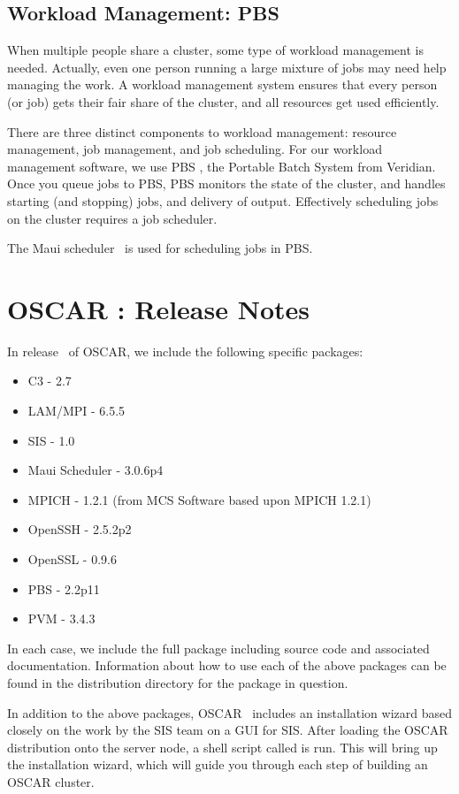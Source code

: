 \documentclass[letterpaper,11pt]{article}
\begin{document}
\subsection{Workload Management: PBS}
When multiple people share a cluster, some type of workload management
is needed.  Actually, even one person running a large mixture of jobs
may need help managing the work.  A workload management system ensures
that every person (or job) gets their fair share of the cluster, and
all resources get used efficiently.

There are three distinct components to workload management: resource
management, job management, and job scheduling.  For our workload
management software, we use PBS \cite{OpenPBS}, the Portable Batch System
from Veridian.  Once you queue jobs to PBS, PBS monitors the state of
the cluster, and handles starting (and stopping) jobs, and delivery of
output.  Effectively scheduling jobs on the cluster requires a job
scheduler.

The Maui scheduler~\cite{MAUI} is used for scheduling jobs in PBS.

\section{OSCAR \oscarversion: Release Notes}
In release \oscarversion\ of OSCAR, we include the following specific
packages:
\begin{itemize}
        \item C3 - 2.7
        \item LAM/MPI - 6.5.5
        \item SIS - 1.0
        \item Maui Scheduler - 3.0.6p4
        \item MPICH - 1.2.1 (from MCS Software based upon MPICH 1.2.1)
        \item OpenSSH - 2.5.2p2
        \item OpenSSL - 0.9.6
        \item PBS - 2.2p11
        \item PVM - 3.4.3
\end{itemize}

In each case, we include the full package including source code and
associated documentation.  Information about how to use each of the
above packages can be found in the distribution directory for the
package in question.

In addition to the above packages, OSCAR \oscarversion\ includes an
installation wizard based closely on the work by the SIS team on a GUI
for SIS.  After loading the OSCAR distribution onto the server node, a
shell script called  is run.  This will bring up
the installation wizard, which will guide you through each step of
building an OSCAR cluster.
\end{document}
